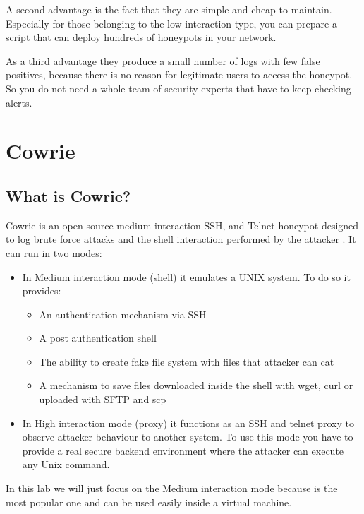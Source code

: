 \documentclass[epsfig,a4paper,11pt,titlepage,oneside,openany]{book}
\begin{document}
A second advantage is the fact that they are simple and cheap  to maintain. Especially for those belonging to the low interaction type, you can prepare a script that can deploy hundreds of honeypots in your network.

As a third advantage they produce a small number of logs with few false positives, because there is no reason for legitimate users to access the honeypot. So you do not need a whole team of security experts that have to keep checking alerts.

\chapter{Cowrie}

\section{What is Cowrie?}

Cowrie is an open-source medium interaction SSH, and Telnet honeypot designed to log brute force attacks and the shell interaction performed by the attacker \cite{whatcowrie}.
It can run in two modes:
\begin{itemize}
\itemsep0em 
\item In Medium interaction mode (shell) it emulates a UNIX system. To do so it provides:
	\begin{itemize}
	\itemsep0em 
	\item An authentication mechanism via SSH
	\item A  post authentication shell
	\item The ability to create fake file system with files that attacker can cat
	\item A mechanism to save files downloaded inside the shell with wget, curl or uploaded with SFTP and scp
	\end{itemize}
\item In High interaction mode (proxy) it functions as an SSH and telnet proxy to observe attacker behaviour to another system. To use this mode you have to provide a real secure backend environment where the attacker can execute any Unix command.
\end{itemize}

\noindent In this lab we will just focus on the Medium interaction mode because is the most popular one and can be used easily inside a virtual machine.
\end{document}
